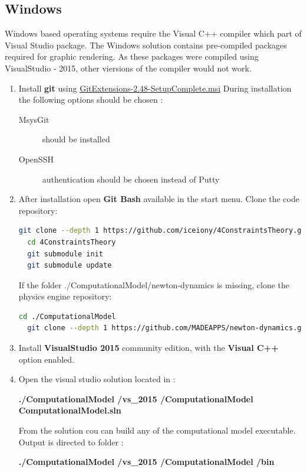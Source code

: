 \documentclass[
    a4paper,
    man,
    floatsintext,
    british
]{apa6}
\begin{document}
\subsection{Windows}
Windows based operating systems require the Visual C++ compiler which part of Visual Studio package.
The Windows solution contains pre-compiled packages required for graphic rendering. 
As these packages were compiled using VisualStudio - 2015, other viersions of the compiler would not work.   
\begin{enumerate}

  \item Install \textbf{git} using 
    \href{https://github.com/gitextensions/gitextensions/releases/latest}{GitExtensions-2.48-SetupComplete.msi} 
    During installation the following options should be chosen : 
    \begin{description}
	\item [MsysGit] should be installed 
	\item [OpenSSH] authentication should be chosen instead of Putty
    \end{description}

  \item After installation open \textbf{Git Bash} available in the start menu. Clone the code repository:   
    \begin{lstlisting}[language=bash]
  git clone --depth 1 https://github.com/iceiony/4ConstraintsTheory.git 
  cd 4ConstraintsTheory
  git submodule init
  git submodule update
    \end{lstlisting}

    If the folder ./ComputationalModel/newton-dynamics is missing, clone the physics engine repository:
    \begin{lstlisting}[language=bash]
  cd ./ComputationalModel
  git clone --depth 1 https://github.com/MADEAPPS/newton-dynamics.git 
    \end{lstlisting}

  \item Install \textbf{VisualStudio 2015} community edition, with the \textbf{Visual C++} option enabled. 
  
  \item Open the visual studio solution located in : 
    
    \textbf{./ComputationalModel  /vs\_2015  /ComputationalModel  ComputationalModel.sln}
    
    From the solution cou can build any of the computational model executable.
    Output is directed to folder :
    
    \textbf{./ComputationalModel /vs\_2015 /ComputationalModel /bin} 

\end{enumerate}
\end{document}

